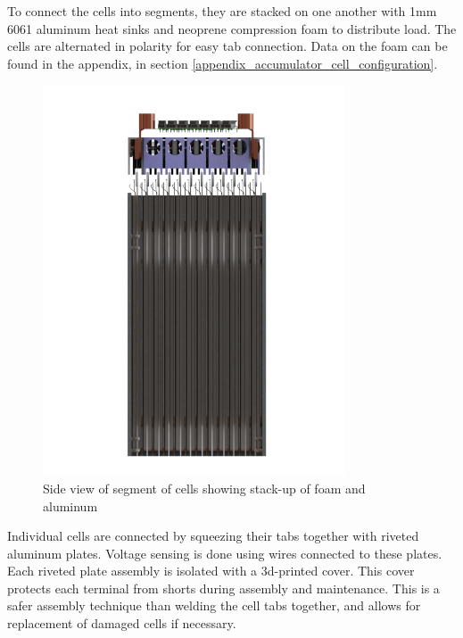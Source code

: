 \documentclass{article}
\begin{document}
To connect the cells into segments, they are stacked on one another with 1mm 6061 aluminum heat sinks and neoprene compression foam to distribute load. The cells are alternated in polarity for easy tab connection. Data on the foam can be found in the appendix, in section \ref{appendix_accumulator_cell_configuration}.

\begin{figure}[H]
\centering
\includegraphics[width=0.8\textwidth]{module_2_side.png}
\caption{Side view of segment of cells showing stack-up of foam and aluminum}
\label{fig:module_side_view}
\end{figure}

Individual cells are connected by squeezing their tabs together with riveted aluminum plates. Voltage sensing is done using wires connected to these plates. Each riveted plate assembly is isolated with a 3d-printed cover. This cover protects each terminal from shorts during assembly and maintenance. This is a safer assembly technique than welding the cell tabs together, and allows for replacement of damaged cells if necessary.
\end{document}
